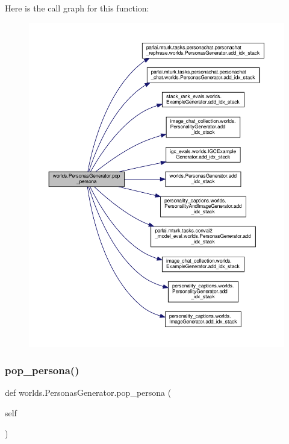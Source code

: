 Here is the call graph for this function\+:
\nopagebreak
\begin{figure}[H]
\begin{center}
\leavevmode
\includegraphics[width=350pt]{classworlds_1_1PersonasGenerator_ada6f80abe6e9881a2ac225015531788c_cgraph}
\end{center}
\end{figure}
\mbox{\label{classworlds_1_1PersonasGenerator_ada6f80abe6e9881a2ac225015531788c}} 
\subsubsection{\texorpdfstring{pop\+\_\+persona()}{pop\_persona()}\hspace{0.1cm}{\footnotesize\ttfamily [2/2]}}
{\footnotesize\ttfamily def worlds.\+Personas\+Generator.\+pop\+\_\+persona (\begin{DoxyParamCaption}\item[{}]{self }\end{DoxyParamCaption})}



